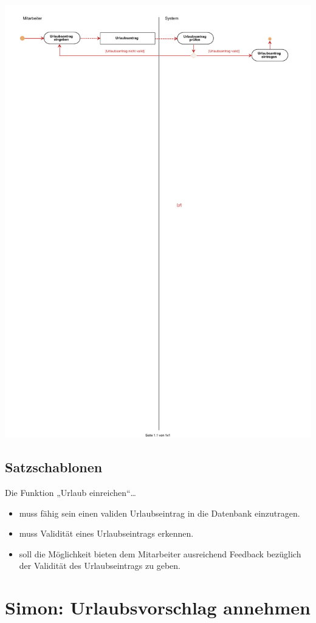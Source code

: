 \begin{center}
	\includegraphics[width=0.9\linewidth]{Urlaub_einreichen.pdf}
\end{center}

\subsection{Satzschablonen}
Die Funktion „Urlaub einreichen“…
\begin{itemize}
\item muss fähig sein einen validen Urlaubseintrag in die Datenbank einzutragen.
\item muss Validität eines Urlaubseintrags erkennen.
\item soll die Möglichkeit bieten dem Mitarbeiter ausreichend Feedback bezüglich der Validität des Urlaubseintrags zu geben.
\end{itemize}

\section{Simon: Urlaubsvorschlag annehmen}

